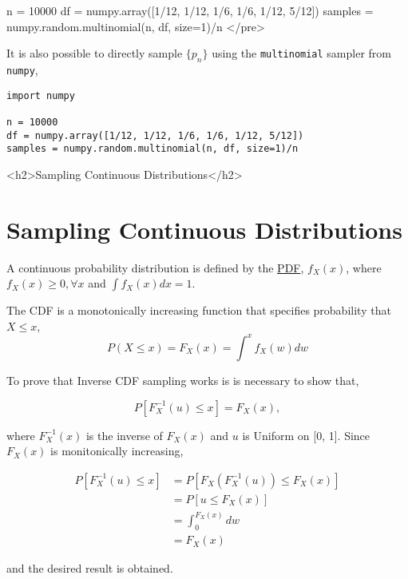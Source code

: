 \documentclass[12pt]{article}
\begin{document}
n = 10000
df = numpy.array([1/12, 1/12, 1/6, 1/6, 1/12, 5/12])
samples = numpy.random.multinomial(n, df, size=1)/n
</pre>
\fi

\iftex
It is also possible to directly sample $\{p_n\}$ using the \texttt{multinomial} sampler from
\texttt{numpy},

\begin{verbatim}
import numpy

n = 10000
df = numpy.array([1/12, 1/12, 1/6, 1/6, 1/12, 5/12])
samples = numpy.random.multinomial(n, df, size=1)/n
\end{verbatim}
\fi

\ifblog
<h2>Sampling Continuous Distributions</h2>
\fi
\iftex
\section{Sampling Continuous Distributions}
\fi

A continuous probability distribution is defined by the  \href{https://en.wikipedia.org/wiki/Probability_density_function}{PDF},
$f_X(x)$, where $f_X(x) \geq 0, \forall x$ and $\int f_X(x) dx = 1.$

The CDF is a monotonically increasing function that specifies probability that $X \leq x$,
\begin{equation}
\label{eq:continuous_cdf}
P(X \leq x) = F_X(x) = \int^{x} f_X(w) dw
\end{equation}

To prove that Inverse CDF sampling works is is necessary to show that,

$$P[F_X^{-1}(u) \leq x] = F_X(x),$$

where $F_X^{-1}(x)$ is the inverse of $F_X(x)$ and $u$ is Uniform on [0, 1]. Since $F_X(x)$ is monitonically increasing,

$$
\begin{aligned}
P[F_X^{-1}(u) \leq x] & = P[F_X(F_X^{-1}(u)) \leq F_X(x)] \\
& = P[u \leq F_X(x)] \\
& = \int_{0}^{F_X(x)} dw \\
& = F_X(x)
\end{aligned}
$$

and the desired result is obtained.
\end{document}
